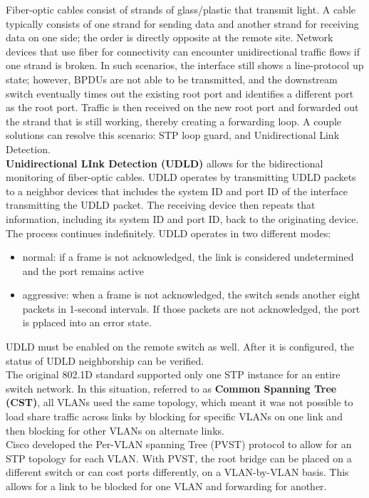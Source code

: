 \documentclass{article}
\begin{document}
Fiber-optic cables consist of strands of glass/plastic that transmit light. A cable typically consists of one strand for sending data and another strand for receiving data on one side; the order is directly opposite at the remote site. Network devices that use fiber for connectivity can encounter unidirectional traffic flows if one strand is broken. In such scenarios, the interface still shows a line-protocol up state; however, BPDUs are not able to be transmitted, and the downstream switch eventually times out the existing root port and identifies a different port as the root port. Traffic is then received on the new root port and forwarded out the strand that is still working, thereby creating a forwarding loop. A couple solutions can resolve this scenario: STP loop guard, and Unidirectional Link Detection.\\

\textbf{Unidirectional LInk Detection (UDLD)} allows for the bidirectional monitoring of fiber-optic cables. UDLD operates by transmitting UDLD packets to a neighbor devices that includes the system ID and port ID of the interface transmitting the UDLD packet. The receiving device then repeats that information, including its system ID and port ID, back to the originating device. The process continues indefinitely. UDLD operates in two different modes:
	\begin{itemize}
		\item normal: if a frame is not acknowledged, the link is considered undetermined and the port remains active
		\item aggressive: when a frame is not acknowledged, the switch sends another eight packets in 1-second intervals. If those packets are not acknowledged, the port is pplaced into an error state.
	\end{itemize}
UDLD must be enabled on the remote switch as well. After it is configured, the status of UDLD neighborship can be verified.\\

The original 802.1D standard supported only one STP instance for an entire switch network. In this situation, referred to as \textbf{Common Spanning Tree (CST)}, all VLANs used the same topology, which meant it was not possible to load share traffic across links by blocking for specific VLANs on one link and then blocking for other VLANs on alternate links.\\

Cisco developed the Per-VLAN spanning Tree (PVST) protocol to allow for an STP topology for each VLAN. With PVST, the root bridge can be placed on a different switch or can cost ports differently, on a VLAN-by-VLAN basis. This allows for a link to be blocked for one VLAN and forwarding for another.\\
\end{document}
